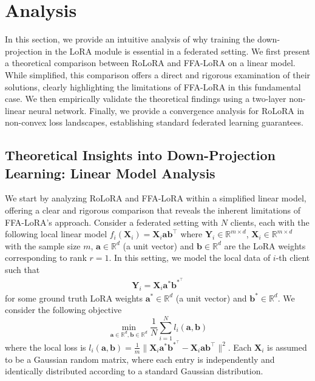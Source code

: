 \documentclass{article}
\theoremstyle{plain}
\theoremstyle{definition}
\theoremstyle{remark}
\begin{document}
\section{Analysis} \label{sec:analysis}
\vspace{-0.2cm}
In this section, we provide an intuitive analysis of why training the down-projection in the LoRA module is essential in a federated setting. We first present a theoretical comparison between RoLoRA and FFA-LoRA on a linear model. While simplified, this comparison offers a direct and rigorous examination of their solutions, clearly highlighting the limitations of FFA-LoRA in this fundamental case. We then empirically validate the theoretical findings using a two-layer non-linear neural network. Finally, we provide a convergence analysis for RoLoRA in non-convex loss landscapes, establishing standard federated learning guarantees.

\subsection{Theoretical Insights into Down-Projection Learning: Linear Model Analysis} 
\label{setup-analysis-homo}
We start by analyzing RoLoRA and FFA-LoRA within a simplified linear model, offering a clear and rigorous comparison that reveals the inherent limitations of FFA-LoRA’s approach. Consider a federated setting with $N$ clients, each with the following local linear model $f_i(\mathbf{X}_i)=\mathbf{X}_i\mathbf{a}\mathbf{b}^\top$
where $\mathbf{Y}_i \in \mathbb{R}^{m \times d}$, $ \mathbf{X}_i \in \mathbb{R}^{m \times d}$ with the sample size $m$, $\mathbf{a} \in \mathbb{R}^{d}$ (a unit vector) and $\mathbf{b} \in \mathbb{R}^{d}$ are the LoRA weights corresponding to rank $r=1$. In this setting, we model the local data of $i$-th client such that 
\begin{align}
\mathbf{Y}_i=\mathbf{X}_i\mathbf{a}^*\mathbf{b}^{*^\top} \label{data-gen}
\end{align}
for some ground truth LoRA weights $\mathbf{a}^* \in \mathbb{R}^{d}$ (a unit vector) and $\mathbf{b}^* \in \mathbb{R}^d$. We consider the following objective
\begin{equation}
    \min_{\mathbf{a}\in \mathbb{R}^{d},\mathbf{b}\in \mathbb{R}^d} \frac{1}{N}\sum_{i=1}^N l_i(\mathbf{a},\mathbf{b}) \label{obj-xi}
\end{equation}
where the local loss is $l_i(\mathbf{a},\mathbf{b}) = \frac{1}{m}\lVert  \mathbf{X}_i\mathbf{a}^*\mathbf{b}^{*^\top}- \mathbf{X}_i\mathbf{a}\mathbf{b}^\top\rVert^2$. Each $\mathbf{X}_i$ is assumed to be a Gaussian random matrix, where each entry is independently and identically distributed according to a standard Gaussian distribution.
\end{document}

